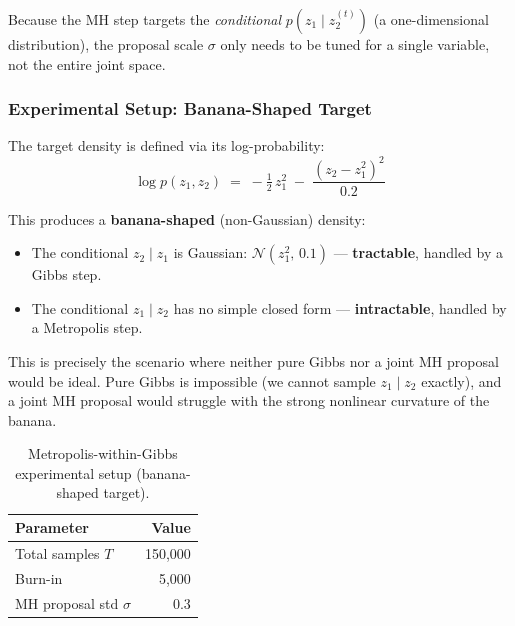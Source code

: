 \documentclass[12pt, a4paper]{article}
\begin{document}
Because the MH step targets the \emph{conditional}
$p(z_1 \mid z_2^{(t)})$ (a one-dimensional distribution), the
proposal scale $\sigma$ only needs to be tuned for a single
variable, not the entire joint space.

\subsubsection{Experimental Setup: Banana-Shaped Target}

The target density is defined via its log-probability:
\begin{equation}
    \log p(z_1, z_2) \;=\;
    -\tfrac{1}{2}\,z_1^{2}
    \;-\; \frac{(z_2 - z_1^{2})^{2}}{0.2}
    \label{eq:mwg_target}
\end{equation}

This produces a \textbf{banana-shaped} (non-Gaussian) density:
\begin{itemize}
    \item The conditional $z_2 \mid z_1$ is Gaussian:
          $\mathcal{N}(z_1^2,\, 0.1)$ --- \textbf{tractable},
          handled by a Gibbs step.
    \item The conditional $z_1 \mid z_2$ has no simple
          closed form --- \textbf{intractable}, handled by a
          Metropolis step.
\end{itemize}

This is precisely the scenario where neither pure Gibbs nor a
joint MH proposal would be ideal.  Pure Gibbs is impossible
(we cannot sample $z_1 \mid z_2$ exactly), and a joint MH
proposal would struggle with the strong nonlinear curvature
of the banana.

\begin{table}[H]
    \centering
    \begin{tabular}{lr}
        \toprule
        \textbf{Parameter} & \textbf{Value} \\
        \midrule
        Total samples $T$
            & 150{,}000 \\
        Burn-in
            & 5{,}000 \\
        MH proposal std $\sigma$
            & 0.3 \\
        \bottomrule
    \end{tabular}
    \caption{Metropolis-within-Gibbs experimental setup
             (banana-shaped target).}
    \label{tab:mwg_setup}
\end{table}
\end{document}
